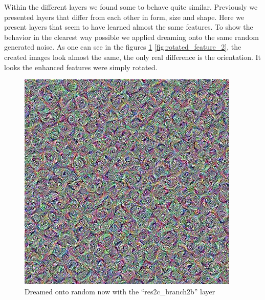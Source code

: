 Within the different layers we found some to behave quite similar.
Previously we presented layers that differ from each other in form, size and shape.
Here we present layers that seem to have learned almost the same features.
To show the behavior in the clearest way possible we applied dreaming onto the same random generated noise.
As one can see in the figures \ref{fig:rotated_feature_1} \ref{fig:rotated_feature_2}, the created images look almost the same, the only real difference is the orientation.
It looks the enhanced features were simply rotated.

\begin{figure}[H]
	\centering
	\includegraphics[width=1\linewidth]{img/rotated_feature_1.jpg}
	\caption{Dreamed onto random now with the \enquote{res2c\_branch2b} layer}
	\label{fig:rotated_feature_1}
	\endminipage\hfill
	\centering

\end{figure}

